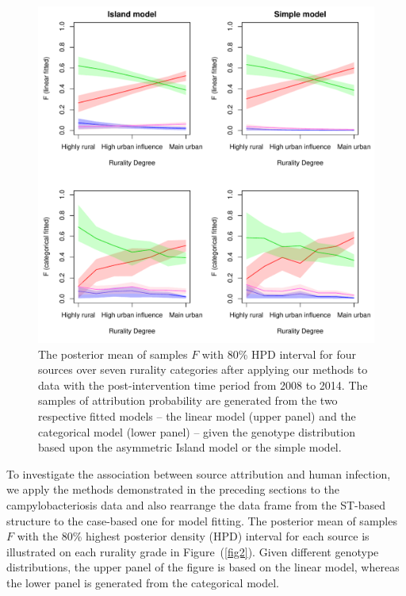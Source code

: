 \documentclass[times, doublespace]{simauth}%
\begin{document}
\begin{figure}
\centering
\includegraphics[width=.9\linewidth]{Figures/FCILandC(8)}
\caption{The posterior mean of samples $F$ with 80\% HPD interval for four sources over seven rurality categories after applying our methods to data with the post-intervention time period from 2008 to 2014. The samples of attribution probability are generated from the two respective fitted models -- the linear model (upper panel) and the categorical model (lower panel) -- given the genotype distribution based upon the asymmetric Island model or the simple model.}
\label{fig3}
\end{figure}

To investigate the association between source attribution and human infection, we apply the methods demonstrated in the preceding sections to the campylobacteriosis data and also rearrange the data frame from the ST-based structure to the case-based one for model fitting. The posterior mean of samples $F$ with the 80\% highest posterior density (HPD) interval for each source is illustrated on each rurality grade in Figure~(\ref{fig2}). Given different genotype distributions, the upper panel of the figure is based on the linear model, whereas the lower panel is generated from the categorical model.
\end{document}
